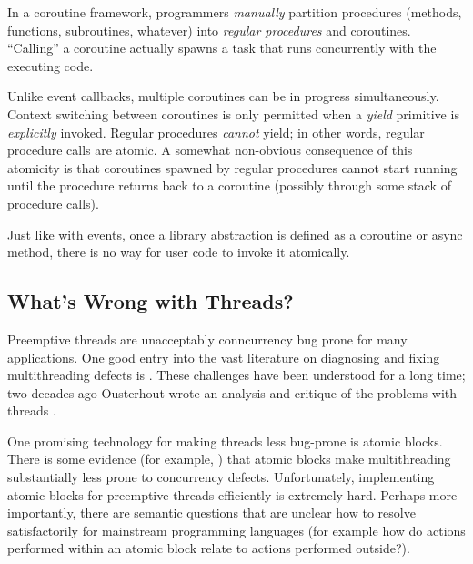 \documentclass[9pt,preprint]{sigplanconf}
\begin{document}

In a coroutine framework, programmers \emph{manually} partition procedures (methods, functions, subroutines, whatever) into \emph{regular procedures} and coroutines.
``Calling'' a coroutine actually spawns a task that runs concurrently with the executing code.

Unlike event callbacks, multiple coroutines can be in progress simultaneously.
Context switching between coroutines is only permitted when a \emph{yield} primitive is \emph{explicitly} invoked.
Regular procedures \emph{cannot} yield; in other words, regular procedure calls are atomic.
A somewhat non-obvious consequence of this atomicity is that coroutines spawned by regular procedures cannot start running until the procedure returns back to a coroutine (possibly through some stack of procedure calls).

Just like with events, once a library abstraction is defined as a coroutine or async method, there is no way for user code to invoke it atomically.

\subsection{What's Wrong with Threads?}

Preemptive threads are unacceptably conncurrency bug prone for many applications.
One good entry into the vast literature on diagnosing and fixing multithreading defects is \cite{Lu2008}.
These challenges have been understood for a long time; two decades ago Ousterhout wrote an analysis and critique of the problems with threads \cite{Ousterhout1996}.

One promising technology for making threads less bug-prone is atomic blocks.
There is some evidence (for example, \cite{Pankratius2014}) that atomic blocks make multithreading substantially less prone to concurrency defects.
Unfortunately, implementing atomic blocks for preemptive threads efficiently is extremely hard.
Perhaps more importantly, there are semantic questions that are unclear how to resolve satisfactorily for mainstream programming languages (for example how do actions performed within an atomic block relate to actions performed outside?).



\end{document}
